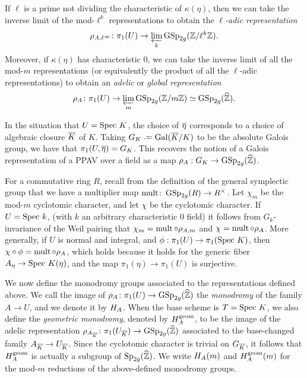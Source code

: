 If $\ell$ is a prime not dividing the characteristic of $\kappa(\eta)$, then we can take the inverse limit of the mod-$\ell^k$ representations to obtain the \emph{$\ell$-adic representation}
\begin{equation}\label{itsladicguys}
\rho_{A,\ell^\infty} \colon \pi_1(U) \to \varprojlim_k{\operatorname{GSp}_{2g}(\mathbb Z/\ell^k \mathbb Z)}.
\end{equation}
Moreover, if $\kappa(\eta)$ has characteristic $0$, we can take the inverse limit of all the mod-$m$ representations (or equivalently the product of all the $\ell$-adic representations) to obtain an \emph{adelic} or \emph{global representation}
\begin{equation}\label{thisisthepartofme}
	\rho_A \colon \pi_1(U) \to \varprojlim_m {\operatorname{GSp}_{2g}(\mathbb Z/m \mathbb Z)} \simeq \operatorname{GSp}_{2g}(\widehat{\mathbb Z}).
\end{equation}
\vspace*{-0.2in}
\begin{remark}
In the situation that $U = \text{Spec } K$, the choice of $\overline{\eta}$ corresponds to a choice of algebraic closure $\overline{K}$ of $K$. Taking $G_K \defeq \Gal(\ol{K}/K)$ to be the absolute Galois group, we have that $\pi_1(U, \overline{\eta}) = G_K$. This recovers the notion of a Galois representation of a PPAV over a field as a map $\rho_A: G_K \rightarrow \operatorname{GSp}_{2g}(\widehat{\mathbb Z})$.
\end{remark}
\vspace*{-0.1in}
\begin{remark}
	\label{remark:det-rho-is-chi}
For a commutative ring $R$, recall from the definition of the general symplectic group that we have a multiplier map $\operatorname{mult} \colon \operatorname{GSp}_{2g}(R) \to R^\times$. Let $\chi_m$ be the mod-$m$ cyclotomic character, and let $\chi$ be the cyclotomic character. If $U = \text{Spec } k$, (with $k$ an arbitrary characteristic $0$ field) it follows from $G_k$-invariance of the Weil pairing that $\chi_m = \operatorname{mult} \circ \rho_{A,m}$ and $\chi = \operatorname{mult} \circ \rho_{A}$.
More generally, if $U$ is normal and integral, and $\phi: \pi_1(U) \rightarrow \pi_1(\text{Spec } K)$, then
$\chi \circ \phi = \operatorname{mult} \circ \rho_A$,
which holds because it holds for the generic fiber $A_\eta \rightarrow \text{Spec } K(\eta)$, and the map $\pi_1(\eta) \rightarrow \pi_1(U)$ is surjective.
\end{remark}

We now define the monodromy groups associated to the representations defined above. We call the image of $\rho_A \colon \pi_1(U) \to \operatorname{GSp}_{2g}(\widehat{\mathbb Z})$ the {\it monodromy} of the family $A \to U$, and we denote it by $H_A$. When the base scheme is $T = \text{Spec } K$, we also define the {\it geometric monodromy}, denoted by $H_A^{\operatorname{geom}}$, to be the image of the adelic representation $\rho_{A_{\overline K}}\colon \pi_1(U_{\overline K}) \rightarrow \operatorname{GSp}_{2g}(\widehat{\mathbb Z})$ associated to the base-changed family $A_{\overline{K}} \to U_{\overline{K}}$.
Since the cyclotomic character is trivial on $G_{\overline{K}}$, it follows that $H_A^{\operatorname{geom}}$ is actually a subgroup of $\operatorname{Sp}_{2g}(\widehat{\mathbb Z})$. We write $H_A(m)$ and $H_A^{\operatorname{geom}}(m)$ for the mod-$m$ reductions of the above-defined monodromy groups.

